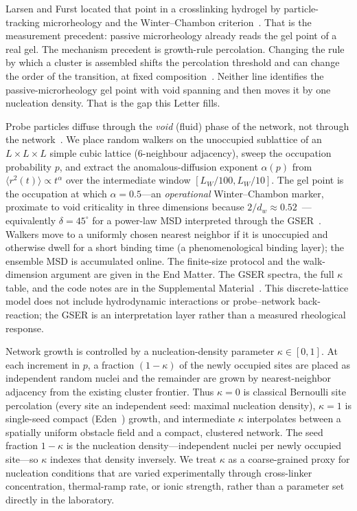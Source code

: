 \documentclass[aps,prl,twocolumn,superscriptaddress,floatfix,nofootinbib,longbibliography]{revtex4-2}
\newcommand{\msd}{\langle r^2(t)\rangle}
\newcommand{\kap}{\kappa}
\begin{document}
Larsen and Furst located that point in a crosslinking hydrogel by particle-tracking microrheology and the Winter--Chambon criterion~\cite{Larsen2008,Corrigan2009}. That is the measurement precedent: passive microrheology already reads the gel point of a real gel. The mechanism precedent is growth-rule percolation. Changing the rule by which a cluster is assembled shifts the percolation threshold and can change the order of the transition, at fixed composition~\cite{Anderson1988,Roy2017,Roy2018,DSouzaNagler2015}. Neither line identifies the passive-microrheology gel point with void spanning and then moves it by one nucleation density. That is the gap this Letter fills.

Probe particles diffuse through the \emph{void} (fluid) phase of the network, not through the network~\cite{deBruyn2013,Rich2011,Oppong2006}. We place random walkers on the unoccupied sublattice of an $L\times L\times L$ simple cubic lattice (6-neighbour adjacency), sweep the occupation probability $p$, and extract the anomalous-diffusion exponent $\alpha(p)$ from $\msd\propto t^{\alpha}$ over the intermediate window $[L_W/100,L_W/10]$. The gel point is the occupation at which $\alpha=0.5$---an \emph{operational} Winter--Chambon marker, proximate to void criticality in three dimensions because $2/d_w\approx0.52$~\cite{AlexanderOrbach1982}---equivalently $\delta=45^{\circ}$ for a power-law MSD interpreted through the GSER~\cite{Winter1987,Chambon1987,Muthukumar1989}. Walkers move to a uniformly chosen nearest neighbor if it is unoccupied and otherwise dwell for a short binding time (a phenomenological binding layer); the ensemble MSD is accumulated online. The finite-size protocol and the walk-dimension argument are given in the End Matter. The GSER spectra, the full $\kap$ table, and the code notes are in the Supplemental Material~\cite{SM}. This discrete-lattice model does not include hydrodynamic interactions or probe--network back-reaction; the GSER is an interpretation layer rather than a measured rheological response.

Network growth is controlled by a nucleation-density parameter $\kap\in[0,1]$. At each increment in $p$, a fraction $(1-\kap)$ of the newly occupied sites are placed as independent random nuclei and the remainder are grown by nearest-neighbor adjacency from the existing cluster frontier. Thus $\kap=0$ is classical Bernoulli site percolation (every site an independent seed: maximal nucleation density), $\kap=1$ is single-seed compact (Eden~\cite{Eden1961}) growth, and intermediate $\kap$ interpolates between a spatially uniform obstacle field and a compact, clustered network. The seed fraction $1-\kap$ is the nucleation density---independent nuclei per newly occupied site---so $\kap$ indexes that density inversely. We treat $\kap$ as a coarse-grained proxy for nucleation conditions that are varied experimentally through cross-linker concentration, thermal-ramp rate, or ionic strength, rather than a parameter set directly in the laboratory.
\end{document}
